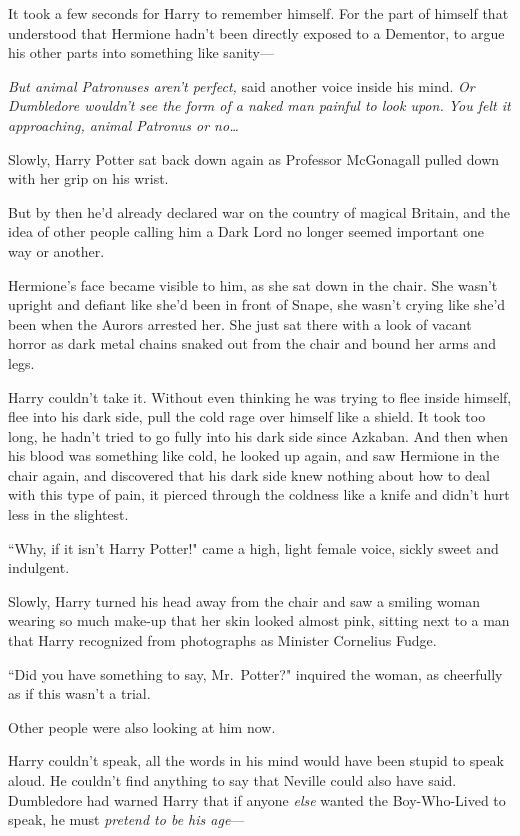 It took a few seconds for Harry to remember himself. For the part of himself that understood that Hermione hadn't been directly exposed to a Dementor, to argue his other parts into something like sanity—

\emph{But animal Patronuses aren't perfect,} said another voice inside his mind. \emph{Or Dumbledore wouldn't see the form of a naked man painful to look upon. You felt it approaching, animal Patronus or no{\ldots}}

Slowly, Harry Potter sat back down again as Professor McGonagall pulled down with her grip on his wrist.

But by then he'd already declared war on the country of magical Britain, and the idea of other people calling him a Dark Lord no longer seemed important one way or another.

Hermione's face became visible to him, as she sat down in the chair. She wasn't upright and defiant like she'd been in front of Snape, she wasn't crying like she'd been when the Aurors arrested her. She just sat there with a look of vacant horror as dark metal chains snaked out from the chair and bound her arms and legs.

Harry couldn't take it. Without even thinking he was trying to flee inside himself, flee into his dark side, pull the cold rage over himself like a shield. It took too long, he hadn't tried to go fully into his dark side since Azkaban. And then when his blood was something like cold, he looked up again, and saw Hermione in the chair again, and discovered that his dark side knew nothing about how to deal with this type of pain, it pierced through the coldness like a knife and didn't hurt less in the slightest.

``Why, if it isn't Harry Potter!" came a high, light female voice, sickly sweet and indulgent.

Slowly, Harry turned his head away from the chair and saw a smiling woman wearing so much make-up that her skin looked almost pink, sitting next to a man that Harry recognized from photographs as Minister Cornelius Fudge.

``Did you have something to say, Mr.~Potter?" inquired the woman, as cheerfully as if this wasn't a trial.

Other people were also looking at him now.

Harry couldn't speak, all the words in his mind would have been stupid to speak aloud. He couldn't find anything to say that Neville could also have said. Dumbledore had warned Harry that if anyone \emph{else} wanted the Boy-Who-Lived to speak, he must \emph{pretend to be his age}—

